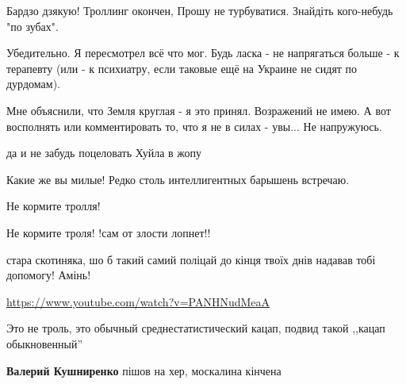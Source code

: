 \begin{itemize}
Бардзо дзякую! Троллинг окончен, Прошу не турбуватися. Знайдіть кого-небудь "по зубах".


Убедительно. Я пересмотрел всё что мог. Будь ласка - не напрягаться больше - к
терапевту (или - к психиатру, если таковые ещё на Украине не сидят по
дурдомам).


Мне объяснили, что Земля круглая - я это принял. Возражений не имею. А вот
восполнять или комментировать то, что я не в силах - увы... Не напружуюсь.

да и не забудь поцеловать Хуйла в жопу

Какие же вы милые! Редко столь интеллигентных барышень встречаю.

Не кормите тролля!

Не кормите троля! !сам от злости лопнет!!

стара скотиняка, шо б такий самий поліцай до кінця твоїх днів надавав тобі допомогу! Амінь!

\url{https://www.youtube.com/watch?v=PANHNudMeaA}

Это не троль, это обычный среднестатистический кацап, подвид такой ,,кацап обыкновенный''

\textbf{Валерий Кушниренко} пішов на хер, москалина кінчена

\end{itemize} %
